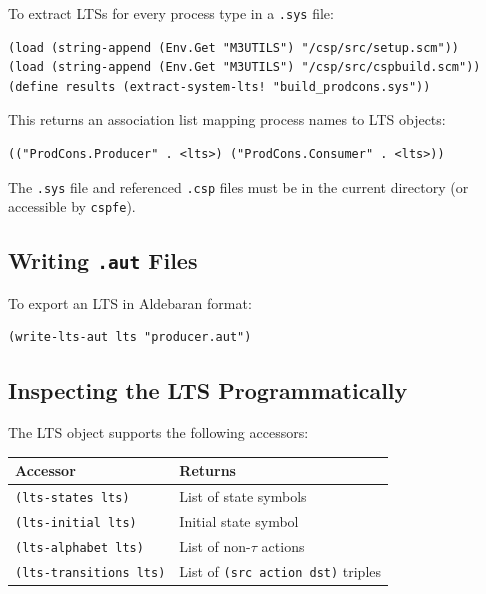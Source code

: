 \documentclass[11pt]{article}
\begin{document}
To extract LTSs for every process type in a \texttt{.sys} file:

\begin{lstlisting}
(load (string-append (Env.Get "M3UTILS") "/csp/src/setup.scm"))
(load (string-append (Env.Get "M3UTILS") "/csp/src/cspbuild.scm"))
(define results (extract-system-lts! "build_prodcons.sys"))
\end{lstlisting}

This returns an association list mapping process names to LTS objects:
\begin{lstlisting}
(("ProdCons.Producer" . <lts>) ("ProdCons.Consumer" . <lts>))
\end{lstlisting}

The \texttt{.sys} file and referenced \texttt{.csp} files must be in
the current directory (or accessible by \texttt{cspfe}).

\subsection{Writing \texttt{.aut} Files}

To export an LTS in Aldebaran format:

\begin{lstlisting}
(write-lts-aut lts "producer.aut")
\end{lstlisting}

\subsection{Inspecting the LTS Programmatically}

The LTS object supports the following accessors:

\begin{center}
\begin{tabular}{ll}
\toprule
\textbf{Accessor} & \textbf{Returns} \\
\midrule
\texttt{(lts-states lts)}      & List of state symbols \\
\texttt{(lts-initial lts)}     & Initial state symbol \\
\texttt{(lts-alphabet lts)}    & List of non-$\tau$ actions \\
\texttt{(lts-transitions lts)} & List of \texttt{(src action dst)} triples \\
\bottomrule
\end{tabular}
\end{center}
\end{document}
